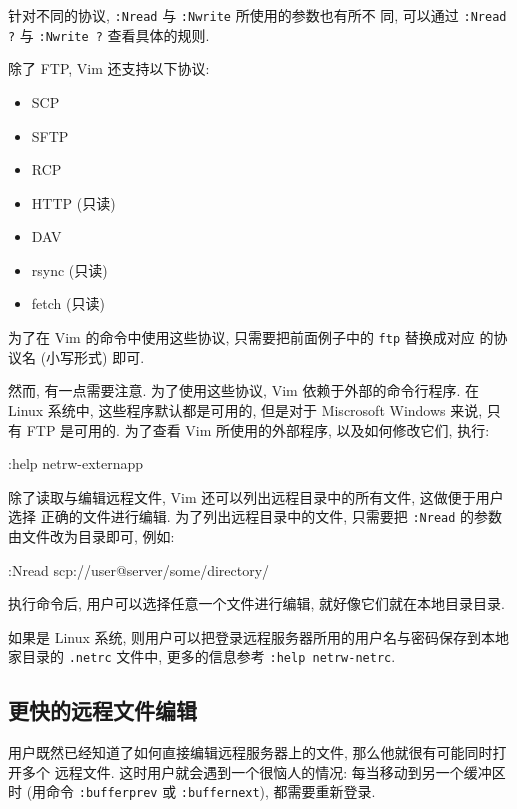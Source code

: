 \begin{warning}
    针对不同的协议, \texttt{:Nread} 与 \texttt{:Nwrite} 所使用的参数也有所不
    同, 可以通过 \texttt{:Nread ?} 与 \texttt{:Nwrite ?} 查看具体的规则.
\end{warning}

除了 FTP, Vim 还支持以下协议:
\begin{itemize}
    \item SCP
    \item SFTP
    \item RCP
    \item HTTP (只读)
    \item DAV
    \item rsync (只读)
    \item fetch (只读)
\end{itemize}

为了在 Vim 的命令中使用这些协议, 只需要把前面例子中的 \texttt{ftp} 替换成对应
的协议名 (小写形式) 即可.

然而, 有一点需要注意. 为了使用这些协议, Vim 依赖于外部的命令行程序. 在 Linux
系统中, 这些程序默认都是可用的, 但是对于 Miscrosoft Windows 来说, 只有 FTP
是可用的. 为了查看 Vim 所使用的外部程序, 以及如何修改它们, 执行:
\begin{vimcode}
:help netrw-externapp
\end{vimcode}

除了读取与编辑远程文件, Vim 还可以列出远程目录中的所有文件, 这做便于用户选择
正确的文件进行编辑. 为了列出远程目录中的文件, 只需要把 \texttt{:Nread} 的参数
由文件改为目录即可, 例如:
\begin{vimcode}
:Nread scp://user@server/some/directory/
\end{vimcode}
执行命令后, 用户可以选择任意一个文件进行编辑, 就好像它们就在本地目录目录.

\begin{warning}
    如果是 Linux 系统, 则用户可以把登录远程服务器所用的用户名与密码保存到本地
    家目录的 \texttt{.netrc} 文件中, 更多的信息参考 \texttt{:help netrw-netrc}.
\end{warning}

\subsection{更快的远程文件编辑}
\label{subsec:faster_remote_file_editing}

用户既然已经知道了如何直接编辑远程服务器上的文件, 那么他就很有可能同时打开多个
远程文件. 这时用户就会遇到一个很恼人的情况: 每当移动到另一个缓冲区时 (用命令
\texttt{:bufferprev} 或 \texttt{:buffernext}), 都需要重新登录.

